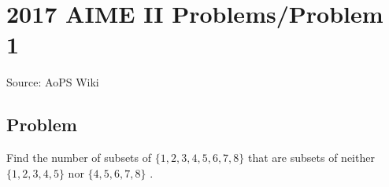 \documentclass[12pt]{article}
\begin{document}
\section*{{2017 AIME II Problems/Problem 1}}
Source: AoPS Wiki

\subsection*{Problem}
Find the number of subsets of $\{1, 2, 3, 4, 5, 6, 7, 8\}$ that are subsets of neither $\{1, 2, 3, 4, 5\}$ nor $\{4, 5, 6, 7, 8\}$ .
\end{document}
